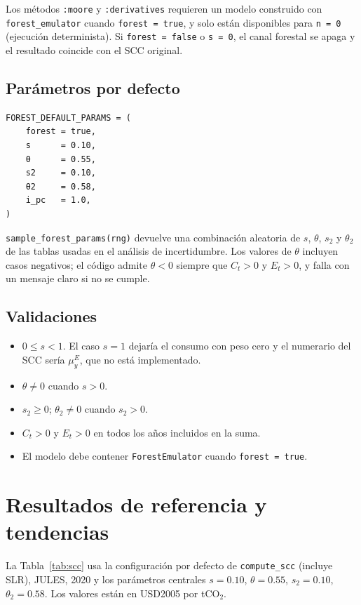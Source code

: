 \documentclass[11pt,a4paper]{article}
\begin{document}
Los métodos \texttt{:moore} y \texttt{:derivatives} requieren un modelo
construido con \texttt{forest\_emulator} cuando \texttt{forest = true}, y solo
están disponibles para \texttt{n = 0} (ejecución determinista). Si
\texttt{forest = false} o \texttt{s = 0}, el canal forestal se apaga y el
resultado coincide con el SCC original.

\subsection{Parámetros por defecto}

\begin{lstlisting}
FOREST_DEFAULT_PARAMS = (
    forest = true,
    s      = 0.10,
    θ      = 0.55,
    s2     = 0.10,
    θ2     = 0.58,
    i_pc   = 1.0,
)
\end{lstlisting}

\texttt{sample\_forest\_params(rng)} devuelve una combinación aleatoria de
\(s\), \(\theta\), \(s_2\) y \(\theta_2\) de las tablas usadas en el análisis
de incertidumbre. Los valores de \(\theta\) incluyen casos negativos; el código
admite \(\theta<0\) siempre que \(C_t>0\) y \(E_t>0\), y falla con un mensaje
claro si no se cumple.

\subsection{Validaciones}

\begin{itemize}
  \item \(0 \le s < 1\). El caso \(s=1\) dejaría el consumo con peso cero y
        el numerario del SCC sería \(\mu^E_y\), que no está implementado.
  \item \(\theta \neq 0\) cuando \(s>0\).
  \item \(s_2 \ge 0\); \(\theta_2 \neq 0\) cuando \(s_2>0\).
  \item \(C_t>0\) y \(E_t>0\) en todos los años incluidos en la suma.
  \item El modelo debe contener \texttt{ForestEmulator} cuando
        \texttt{forest = true}.
\end{itemize}

\section{Resultados de referencia y tendencias}

La Tabla~\ref{tab:scc} usa la configuración por defecto de \texttt{compute\_scc}
(incluye SLR), JULES, 2020 y los parámetros centrales \(s=0.10\),
\(\theta=0.55\), \(s_2=0.10\), \(\theta_2=0.58\). Los valores están en USD2005
por tCO\(_2\).
\end{document}
